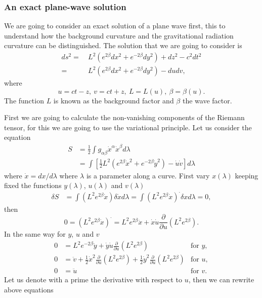 \subsubsection*{An exact plane-wave solution}

We are going to consider an exact solution of a plane wave first,
this to understand how the background curvature and the gravitational
radiation curvature can be distinguished. The solution that we are
going to consider is 
\begin{align*}
ds^{2}= & \ L^{2}\left(e^{2\beta}dx^{2}+e^{-2\beta}dy^{2}\right)+dz^{2}-c^{2}dt^{2}\\
= & \ L^{2}\left(e^{2\beta}dx^{2}+e^{-2\beta}dy^{2}\right)-dudv,
\end{align*}
where
\[
u=ct-z,\ v=ct+z,\ L=L\left(u\right),\ \beta=\beta\left(u\right).
\]
The function $L$ is known as the background factor and $\beta$ the
wave factor.

First we are going to calculate the non-vanishing components of the
Riemann tensor, for this we are going to use the variational principle.
Let us consider the equation
\begin{align*}
S & =\frac{1}{2}\int g_{\alpha\beta}\dot{x}^{\alpha}\dot{x}^{\beta}d\lambda\\
\  & =\int\left[\frac{1}{2}L^{2}\left(e^{2\beta}\dot{x}^{2}+e^{-2\beta}\dot{y}^{2}\right)-\dot{u}\dot{v}\right]d\lambda
\end{align*}
where $\dot{x}=dx/d\lambda$ where $\lambda$ is a parameter along
a curve. First vary $x\left(\lambda\right)$ keeping fixed the functions
$y\left(\lambda\right)$, $u\left(\lambda\right)$ and $v\left(\lambda\right)$
\begin{align*}
\delta S & =\int\left(L^{2}e^{2\beta}\dot{x}\right)\delta\dot{x}d\lambda=\int\left(L^{2}e^{2\beta}\dot{x}\right)^{\cdot}\delta xd\lambda=0,
\end{align*}
then
\[
0=\left(L^{2}e^{2\beta}\dot{x}\right)^{\cdot}=L^{2}e^{2\beta}\ddot{x}+\dot{x}\dot{u}\frac{\partial}{\partial u}\left(L^{2}e^{2\beta}\right).
\]
In the same way for $y$, $u$ and $v$
\begin{align*}
0 & =L^{2}e^{-2\beta}\ddot{y}+\dot{y}\dot{u}\frac{\partial}{\partial u}\left(L^{2}e^{2\beta}\right) & \text{for }y,\\
0 & =\ddot{v}+\frac{1}{2}\dot{x}^{2}\frac{\partial}{\partial u}\left(L^{2}e^{2\beta}\right)+\frac{1}{2}\dot{y}^{2}\frac{\partial}{\partial u}\left(L^{2}e^{2\beta}\right) & \text{for }u,\\
0 & =\ddot{u} & \text{for }v.
\end{align*}
Let us denote with a prime the derivative with respect to $u$, then
we can rewrite above equations

